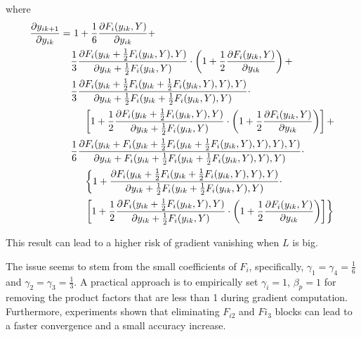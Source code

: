 \documentclass[12pt,a4paper]{report}
\begin{document}
where
\begin{align}\label{eq:5}
  \frac{\partial y_{ik+1}}{\partial y_{ik}} = & \ 1 + \frac{1}{6}\frac{\partial F_i(y_{ik}, Y)}{\partial y_{ik}} \notag  +                                                                                                                                                                         \\
                                              & \frac{1}{3}\frac{\partial F_i(y_{ik} + \frac{1}{2}F_i(y_{ik}, Y), Y)}{\partial y_{ik} + \frac{1}{2}F_i(y_{ik}, Y)} \cdot \left( 1 + \frac{1}{2}\frac{\partial F_i(y_{ik}, Y)}{\partial y_{ik}} \right) \notag +                                    \\
                                              & \frac{1}{3}\frac{\partial F_i(y_{ik} + \frac{1}{2}F_i(y_{ik} + \frac{1}{2}F_i(y_{ik}, Y), Y), Y)}{\partial y_{ik} + \frac{1}{2}F_i(y_{ik} + \frac{1}{2}F_i(y_{ik}, Y), Y)} \cdot \notag                                                            \\
                                              & \ \ \ \ \left[ 1 + \frac{1}{2}\frac{\partial F_i(y_{ik} + \frac{1}{2}F_i(y_{ik}, Y), Y)}{\partial y_{ik} + \frac{1}{2}F_i(y_{ik}, Y)} \cdot \left( 1 + \frac{1}{2}\frac{\partial F_i(y_{ik}, Y)}{\partial y_{ik}} \right)\right] \notag +          \\
                                              & \frac{1}{6}\frac{\partial F_i(y_{ik} + F_i(y_{ik} + \frac{1}{2}F_i(y_{ik} + \frac{1}{2}F_i(y_{ik}, Y), Y), Y), Y)}{\partial y_{ik} + F_i(y_{ik} + \frac{1}{2}F_i(y_{ik} + \frac{1}{2}F_i(y_{ik}, Y), Y), Y)} \cdot \notag                          \\
                                              & \ \ \ \ \left\{ 1 + \frac{\partial F_i(y_{ik} + \frac{1}{2}F_i(y_{ik} + \frac{1}{2}F_i(y_{ik}, Y), Y), Y)}{\partial y_{ik} + \frac{1}{2}F_i(y_{ik} + \frac{1}{2}F_i(y_{ik}, Y), Y)} \cdot \right. \notag                                           \\
                                              & \ \ \ \ \left. \left[ 1 + \frac{1}{2} \frac{\partial F_i(y_{ik} + \frac{1}{2}F_i(y_{ik}, Y), Y)}{\partial y_{ik} + \frac{1}{2}F_i(y_{ik}, Y)} \cdot \left( 1 + \frac{1}{2}\frac{\partial F_i(y_{ik}, Y)}{\partial y_{ik}} \right) \right] \right\}
\end{align}

This result can lead to a higher risk of gradient vanishing when $L$ is big.

The issue seems to stem from the small coefficients of $F_i$, specifically, $\gamma_1 = \gamma_4 = \frac{1}{6}$ and $\gamma_2 = \gamma_3 = \frac{1}{3}$. A practical approach is to empirically set $\gamma_i = 1$, $\beta_p = 1$ for removing the product factors that are less than 1 during gradient computation. Furthermore, experiments shown that eliminating $F_{i2}$ and $F{i_3}$ blocks can lead to a faster convergence and a small accuracy increase.
\end{document}
